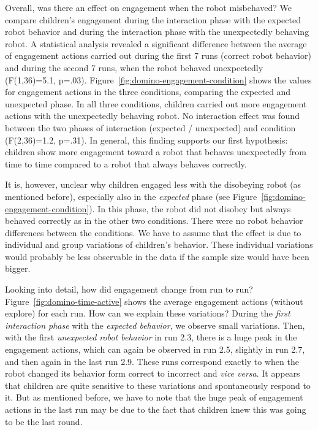 \documentclass{sig-alternate}
\begin{document}
Overall, was there an effect on engagement when the robot misbehaved? We compare
children's engagement during the interaction phase with the expected robot
behavior and during the interaction phase with the unexpectedly behaving robot.
A statistical analysis revealed a significant difference between the average of
engagement actions carried out during the first 7 runs (correct robot behavior)
and during the second 7 runs, when the robot behaved unexpectedly (F(1,36)=5.1,
p=.03). Figure~\ref{fig:domino-engagement-condition} shows the values for
engagement actions in the three conditions, comparing the expected and
unexpected phase. In all three conditions, children carried out more engagement
actions with the unexpectedly behaving robot. No interaction effect was found
between the two phases of interaction (expected / unexpected) and condition
(F(2,36)=1.2, p=.31). In general, this finding supports our first hypothesis:
children show more engagement toward a robot that behaves unexpectedly from time
to time compared to a robot that always behaves correctly.

It is, however, unclear why children engaged less with the disobeying robot (as
mentioned before), especially also in the \textit{expected} phase (see
Figure~\ref{fig:domino-engagement-condition}). In this phase, the robot did not
disobey but always behaved correctly as in the other two conditions. There were
no robot behavior differences between the conditions. We have to assume that the
effect is due to individual and group variations of children's behavior. These
individual variations would probably be less observable in the data if the
sample size would have been bigger.

	
Looking into detail, how did engagement change from run to run?
Figure~\ref{fig:domino-time-active} shows the average engagement actions
(without explore) for each run. How can we explain these variations? During the
\textit{first interaction phase} with the \textit{expected behavior}, we observe
small variations. Then, with the first \textit{unexpected robot behavior} in run
2.3, there is a huge peak in the engagement actions, which can again be observed
in run 2.5, slightly in run 2.7, and then again in the last run 2.9. These runs
correspond exactly to when the robot changed its behavior form correct to
incorrect and \textit{vice versa}. It appears that children are quite sensitive
to these variations and spontaneously respond to it. But as mentioned before, we
have to note that the huge peak of engagement actions in the last run may be due
to the fact that children knew this was going to be the last round.
\end{document}
